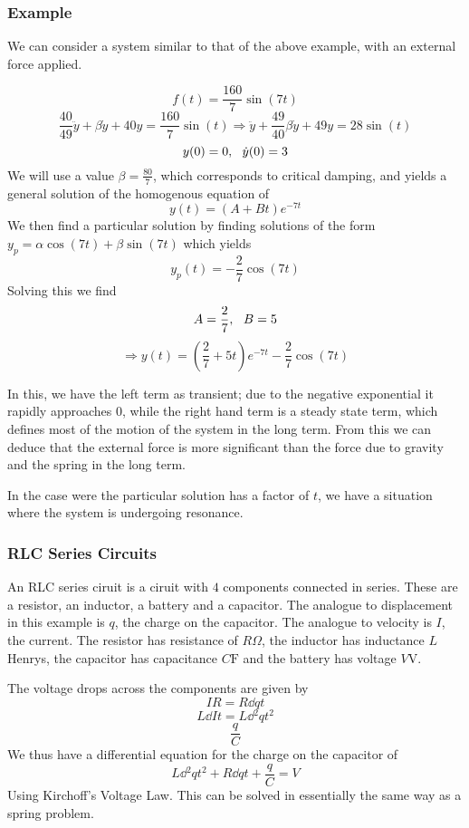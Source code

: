 \documentclass[12pt]{report}
\begin{document}
\begin{flushleft}
\subsubsection*{Example}

We can consider a system similar to that of the above example, with an external
force applied.

\begin{center}    
    \[f(t) = \frac{160}{7}\sin(7t)\]
    \[\frac{40}{49}\ddot{y} + \beta\dot{y} + 40y = \frac{160}{7}\sin(t)
    \Rightarrow \ddot{y} + \frac{49}{40}\beta\dot{y} + 49y = 28\sin(t)\]
    \[y(0) = 0, \:\:\: \dot{y}(0) = 3\]
    We will use a value \(\beta = \frac{80}{7}\), which corresponds to critical
    damping, and yields a general solution of the homogenous equation of
    \[y(t) = (A + Bt)e^{-7t}\]
    We then find a particular solution by finding solutions of the form
    \(y_p = \alpha\cos(7t) + \beta\sin(7t)\) which yields
    \[y_p(t) = -\frac{2}{7}\cos(7t)\]
    Solving this we find
    \[A = \frac{2}{7}, \:\:\: B = 5\]
    \[\Rightarrow y(t) = \left(\frac{2}{7} + 5t\right)e^{-7t} 
    - \frac{2}{7}\cos(7t)\]
\end{center}

In this, we have the left term as transient; due to the negative
exponential it rapidly approaches \(0\), while the right hand term is a
steady state term, which defines most of the motion of the system in the
long term. From this we can deduce that the external force is more significant
than the force due to gravity and the spring in the long term. \par
In the case were the particular solution has a factor of \(t\), we have a
situation where the system is undergoing resonance.

\subsubsection*{RLC Series Circuits}

An RLC series ciruit is a ciruit with \(4\) components connected in series.
These are a resistor, an inductor, a battery and a capacitor. The analogue to
displacement in this example is \(q\), the charge on the capacitor. The
analogue to velocity is \(I\), the current. The resistor has resistance of
\(R\Omega\), the inductor has inductance \(L\) Henrys, the capacitor has
capacitance \(C\mathrm{F}\) and the battery has voltage \(V\mathrm{V}\). \par
The voltage drops across the components are given by
\[IR = R\dd{q}{t}\]
\[L\dd{I}{t} = L\dd{^2q}{t^2}\]
\[\frac{q}{C}\]
We thus have a differential equation for the charge on the capacitor of
\[L\dd{^2q}{t^2} + R\dd{q}{t} + \frac{q}{C} = V\]
Using Kirchoff's Voltage Law. This can be solved in essentially the same
way as a spring problem.


\end{flushleft}
\end{document}
